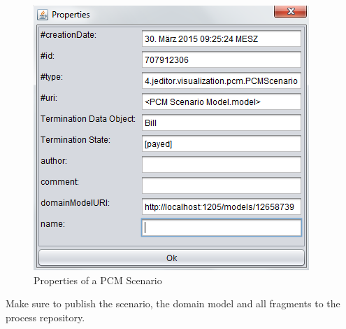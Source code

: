 \begin{figure}[h!]
\includegraphics[height=0.4\textheight]{graphics/scenarioProperties.png}
\caption{Properties of a PCM Scenario}
\label{pic:propscen}
\end{figure}
\noindent
Make sure to publish the scenario, the domain model and all fragments to the process repository.